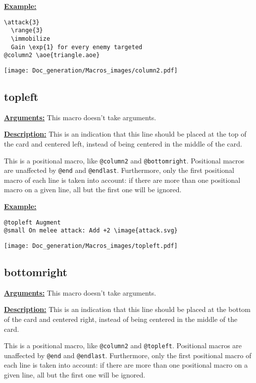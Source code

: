 \documentclass{article}
\begin{document}
\textbf{\underline{Example:}}

\begin{center}
\begin{BVerbatim}
\attack{3}
  \range{3}
  \immobilize
  Gain \exp{1} for every enemy targeted
@column2 \aoe{triangle.aoe}
\end{BVerbatim}

\texttt{[image: Doc\_generation/Macros\_images/column2.pdf]}
\end{center} 

\subsection{topleft}
\textbf{\underline{Arguments:}} This macro doesn't take arguments.

\textbf{\underline{Description:}} This is an indication that this line should be placed at the top of the card and centered left, instead of being centered in the middle of the card.

This is a positional macro, like \verb`@column2` and \verb`@bottomright`. Positional macros are unaffected by \verb`@end` and \verb`@endlast`. Furthermore, only the first positional macro of each line is taken into account: if there are more than one positional macro on a given line, all but the first one will be ignored.

\textbf{\underline{Example:}}

\begin{center}
\begin{BVerbatim}
@topleft Augment
@small On melee attack: Add +2 \image{attack.svg}
\end{BVerbatim}

\texttt{[image: Doc\_generation/Macros\_images/topleft.pdf]}
\end{center}


\subsection{bottomright}
\textbf{\underline{Arguments:}} This macro doesn't take arguments.

\textbf{\underline{Description:}} This is an indication that this line should be placed at the bottom of the card and centered right, instead of being centered in the middle of the card.

This is a positional macro, like \verb`@column2` and \verb`@topleft`. Positional macros are unaffected by \verb`@end` and \verb`@endlast`. Furthermore, only the first positional macro of each line is taken into account: if there are more than one positional macro on a given line, all but the first one will be ignored.
\end{document}
